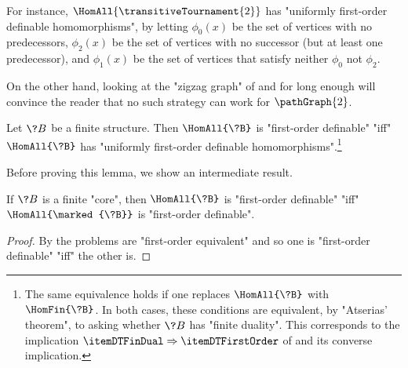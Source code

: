 \begin{example}
	\AP\label{ex:zigzag-FO}
	For instance, $\HomAll{\transitiveTournament{2}}$ has "uniformly first-order definable homomorphisms", by letting $\phi_0(x)$ be the set of vertices with no
	predecessors, $\phi_2(x)$ be the set of vertices with no successor (but at least one predecessor), and $\phi_1(x)$ be the set of vertices that satisfy neither $\phi_0$ not $\phi_2$.

	On the other hand, looking at the "zigzag graph" of  and 
	for long enough will convince the reader that no such strategy can work
	for $\pathGraph{2}$.
\end{example}

\begin{lemma}
	\AP\label{lemma:finite-duality-uniformly-definable-homomorphisms}
	Let $\?B$ be a finite structure. Then $\HomAll{\?B}$ is "first-order definable" "iff"
	$\HomAll{\?B}$ has "uniformly first-order definable homomorphisms".\footnote{The same 
	equivalence holds if one replaces $\HomAll{\?B}$ with $\HomFin{\?B}$.
	In both cases, these conditions are equivalent, by "Atserias' theorem", to asking whether $\?B$
	has "finite duality".
	This corresponds to the implication $\itemDTFinDual \Rightarrow \itemDTFirstOrder$
	of  and its converse implication.}
\end{lemma}

Before proving this lemma, we show an intermediate result.
\begin{fact}
	\AP\label{fact:marking-preserves-finite-duality}
	If $\?B$ is a finite "core", then $\HomAll{\?B}$ is "first-order definable"
	"iff" $\HomAll{\marked{\?B}}$ is "first-order definable".
\end{fact}

\begin{proof}
	By  the problems are "first-order 
	equivalent" and so one is "first-order definable" "iff" the other is.
\end{proof}

